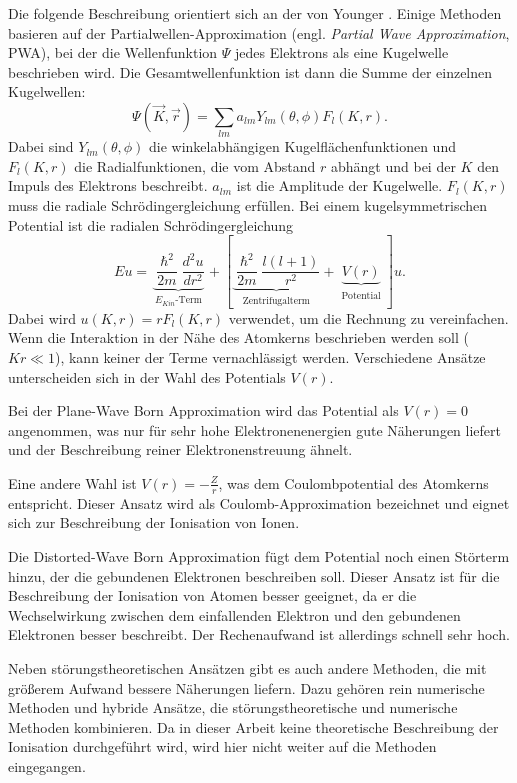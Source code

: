Die folgende Beschreibung orientiert sich an der von Younger \cite{EII}. Einige Methoden basieren auf der Partialwellen-Approximation (engl. \textit{Partial Wave Approximation}, PWA), bei der die Wellenfunktion $\Psi$ jedes Elektrons als eine Kugelwelle beschrieben wird. Die Gesamtwellenfunktion ist dann die Summe der einzelnen Kugelwellen:
\begin{equation}
    \Psi (\vec K, \vec r) = \sum_{lm}a_{lm}Y_{lm}(\theta, \phi) F_l(K,r).
\end{equation}
Dabei sind $Y_{lm}(\theta,\phi)$ die winkelabhängigen Kugelflächenfunktionen und $F_l(K,r)$ die Radialfunktionen, die vom Abstand $r$ abhängt und bei der $K$ den Impuls des Elektrons beschreibt. $a_{lm}$ ist die Amplitude der Kugelwelle. $F_l(K,r)$ muss die radiale Schrödingergleichung erfüllen. Bei einem kugelsymmetrischen Potential ist die radialen Schrödingergleichung
\begin{equation}
    E u = \underbrace{\frac{\hslash^2}{2m}\frac{d^2 u}{dr^2}}_{\substack{\text{$E_{Kin}$-Term}}} + \left[\underbrace{\frac{\hslash^2}{2m} \frac{l(l+1)}{r^2}}_{\substack{\text{Zentrifugalterm}}} + \underbrace{V(r)}_{\substack{\text{Potential}}} \right] u.
\end{equation}
Dabei wird $u(K,r) = rF_l(K,r)$ verwendet, um die Rechnung zu vereinfachen.
Wenn die Interaktion in der Nähe des Atomkerns beschrieben werden soll ($Kr \ll 1$), kann keiner der Terme vernachlässigt werden. Verschiedene Ansätze unterscheiden sich in der Wahl des Potentials $V(r)$. 

Bei der Plane-Wave Born Approximation wird das Potential als $V(r) = 0$ angenommen, was nur für sehr hohe Elektronenenergien gute Näherungen liefert und der Beschreibung reiner Elektronenstreuung ähnelt.

Eine andere Wahl ist $V(r) = -\frac{Z}{r}$, was dem Coulombpotential des Atomkerns entspricht. Dieser Ansatz wird als Coulomb-Approximation bezeichnet und eignet sich zur Beschreibung der Ionisation von Ionen.

Die Distorted-Wave Born Approximation fügt dem Potential noch einen Störterm hinzu, der die gebundenen Elektronen beschreiben soll. Dieser Ansatz ist für die Beschreibung der Ionisation von Atomen besser geeignet, da er die Wechselwirkung zwischen dem einfallenden Elektron und den gebundenen Elektronen besser beschreibt. Der Rechenaufwand ist allerdings schnell sehr hoch.

Neben störungstheoretischen Ansätzen gibt es auch andere Methoden, die mit größerem Aufwand bessere Näherungen liefern. Dazu gehören rein numerische Methoden und hybride Ansätze, die störungstheoretische und numerische Methoden kombinieren. Da in dieser Arbeit keine theoretische Beschreibung der Ionisation durchgeführt wird, wird hier nicht weiter auf die Methoden eingegangen.

